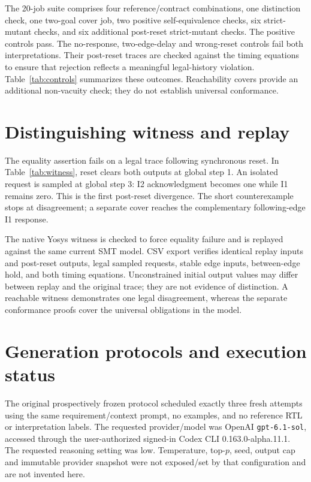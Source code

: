 \documentclass[11pt,a4paper]{article}
\begin{document}
The 20-job suite comprises four reference/contract combinations, one distinction check, one two-goal cover job, two positive self-equivalence checks, six strict-mutant checks, and six additional post-reset strict-mutant checks. The positive controls pass. The no-response, two-edge-delay and wrong-reset controls fail both interpretations. Their post-reset traces are checked against the timing equations to ensure that rejection reflects a meaningful legal-history violation. Table~\ref{tab:controls} summarizes these outcomes. Reachability covers provide an additional non-vacuity check; they do not establish universal conformance.
\begin{table}[ht]
\centering
\caption{Validation controls. Negative entries summarize the additional post-reset checks; full-conformance negative checks also fail.}
\label{tab:controls}
\end{table}

\section{Distinguishing witness and replay}
The equality assertion fails on a legal trace following synchronous reset. In Table~\ref{tab:witness}, reset clears both outputs at global step 1. An isolated request is sampled at global step 3: I2 acknowledgment becomes one while I1 remains zero. This is the first post-reset divergence. The short counterexample stops at disagreement; a separate cover reaches the complementary following-edge I1 response.

\begin{table}[ht]
\centering
\caption{Native distinguishing trace. Initial outputs in row 0 are unspecified. Global steps 1 and 3 contain rising edges.}
\label{tab:witness}
\end{table}

The native Yosys witness is checked to force equality failure and is replayed against the same current SMT model. CSV export verifies identical replay inputs and post-reset outputs, legal sampled requests, stable edge inputs, between-edge hold, and both timing equations. Unconstrained initial output values may differ between replay and the original trace; they are not evidence of distinction. A reachable witness demonstrates one legal disagreement, whereas the separate conformance proofs cover the universal obligations in the model.

\section{Generation protocols and execution status}
The original prospectively frozen protocol scheduled exactly three fresh attempts using the same requirement/context prompt, no examples, and no reference RTL or interpretation labels. The requested provider/model was OpenAI \texttt{gpt-6.1-sol}, accessed through the user-authorized signed-in Codex CLI 0.163.0-alpha.11.1. The requested reasoning setting was low. Temperature, top-$p$, seed, output cap and immutable provider snapshot were not exposed/set by that configuration and are not invented here.
\end{document}
